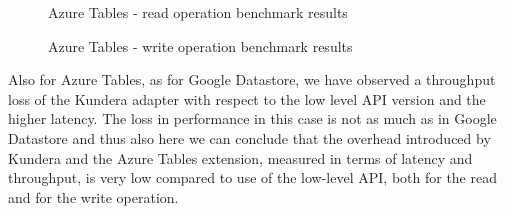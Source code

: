 \begin{figure}[tbh]
  \centering
  \caption{Azure Tables - read operation benchmark results}
  \label{fig:azure-test-read}
\end{figure} 

\begin{figure}[tbh]
  \centering
  \caption{Azure Tables - write operation benchmark results}
  \label{fig:azure-test-write}
\end{figure} 

\noindent Also for Azure Tables, as for Google Datastore, we have observed a throughput loss of the Kundera adapter with respect to the low level API version and the higher latency. The loss in performance in this case is not as much as in Google Datastore and thus also here we can conclude that the overhead introduced by Kundera and the Azure Tables extension, measured in terms of latency and throughput, is very low compared to use of the low-level API, both for the read and for the write operation.

